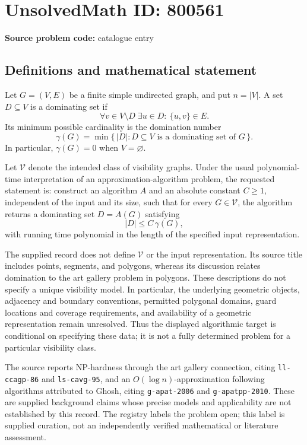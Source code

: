 \documentclass[11pt]{article}
\begin{document}
\section*{UnsolvedMath ID: 800561}
\textbf{Source problem code:} catalogue entry
\subsection{Definitions and mathematical statement}
Let \(G=(V,E)\) be a finite simple undirected graph, and put \(n=|V|\). A set \(D\subseteq V\) is a dominating set if
\[
\forall v\in V\setminus D\;\exists u\in D:\ \{u,v\}\in E.
\]
Its minimum possible cardinality is the domination number
\[
\gamma(G)=\min\{\,|D|:D\subseteq V\text{ is a dominating set of }G\,\}.
\]
In particular, \(\gamma(G)=0\) when \(V=\varnothing\).

Let \(\mathcal V\) denote the intended class of visibility graphs. Under the usual polynomial-time interpretation of an approximation-algorithm problem, the requested statement is: construct an algorithm \(A\) and an absolute constant \(C\geq 1\), independent of the input and its size, such that for every \(G\in\mathcal V\), the algorithm returns a dominating set \(D=A(G)\) satisfying
\[
|D|\leq C\,\gamma(G),
\]
with running time polynomial in the length of the specified input representation.

The supplied record does not define \(\mathcal V\) or the input representation. Its source title includes points, segments, and polygons, whereas its discussion relates domination to the art gallery problem in polygons. These descriptions do not specify a unique visibility model. In particular, the underlying geometric objects, adjacency and boundary conventions, permitted polygonal domains, guard locations and coverage requirements, and availability of a geometric representation remain unresolved. Thus the displayed algorithmic target is conditional on specifying these data; it is not a fully determined problem for a particular visibility class.

The source reports NP-hardness through the art gallery connection, citing \texttt{ll-ccagp-86} and \texttt{ls-cavg-95}, and an \(O(\log n)\)-approximation following algorithms attributed to Ghosh, citing \texttt{g-apat-2006} and \texttt{g-apatpp-2010}. These are supplied background claims whose precise models and applicability are not established by this record. The registry labels the problem open; this label is supplied curation, not an independently verified mathematical or literature assessment.
\end{document}
